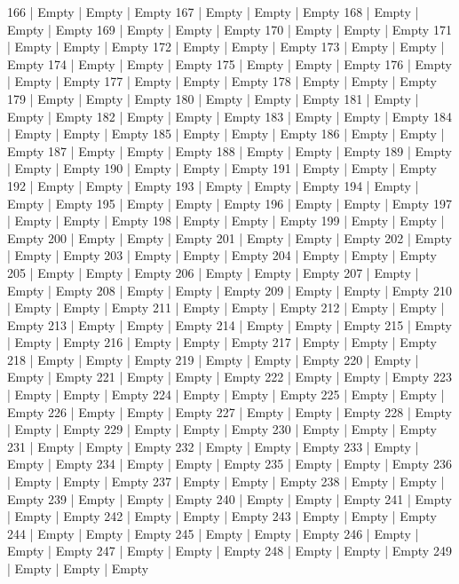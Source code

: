 166  | Empty  | Empty  | Empty
167  | Empty  | Empty  | Empty
168  | Empty  | Empty  | Empty
169  | Empty  | Empty  | Empty
170  | Empty  | Empty  | Empty
171  | Empty  | Empty  | Empty
172  | Empty  | Empty  | Empty
173  | Empty  | Empty  | Empty
174  | Empty  | Empty  | Empty
175  | Empty  | Empty  | Empty
176  | Empty  | Empty  | Empty
177  | Empty  | Empty  | Empty
178  | Empty  | Empty  | Empty
179  | Empty  | Empty  | Empty
180  | Empty  | Empty  | Empty
181  | Empty  | Empty  | Empty
182  | Empty  | Empty  | Empty
183  | Empty  | Empty  | Empty
184  | Empty  | Empty  | Empty
185  | Empty  | Empty  | Empty
186  | Empty  | Empty  | Empty
187  | Empty  | Empty  | Empty
188  | Empty  | Empty  | Empty
189  | Empty  | Empty  | Empty
190  | Empty  | Empty  | Empty
191  | Empty  | Empty  | Empty
192  | Empty  | Empty  | Empty
193  | Empty  | Empty  | Empty
194  | Empty  | Empty  | Empty
195  | Empty  | Empty  | Empty
196  | Empty  | Empty  | Empty
197  | Empty  | Empty  | Empty
198  | Empty  | Empty  | Empty
199  | Empty  | Empty  | Empty
200  | Empty  | Empty  | Empty
201  | Empty  | Empty  | Empty
202  | Empty  | Empty  | Empty
203  | Empty  | Empty  | Empty
204  | Empty  | Empty  | Empty
205  | Empty  | Empty  | Empty
206  | Empty  | Empty  | Empty
207  | Empty  | Empty  | Empty
208  | Empty  | Empty  | Empty
209  | Empty  | Empty  | Empty
210  | Empty  | Empty  | Empty
211  | Empty  | Empty  | Empty
212  | Empty  | Empty  | Empty
213  | Empty  | Empty  | Empty
214  | Empty  | Empty  | Empty
215  | Empty  | Empty  | Empty
216  | Empty  | Empty  | Empty
217  | Empty  | Empty  | Empty
218  | Empty  | Empty  | Empty
219  | Empty  | Empty  | Empty
220  | Empty  | Empty  | Empty
221  | Empty  | Empty  | Empty
222  | Empty  | Empty  | Empty
223  | Empty  | Empty  | Empty
224  | Empty  | Empty  | Empty
225  | Empty  | Empty  | Empty
226  | Empty  | Empty  | Empty
227  | Empty  | Empty  | Empty
228  | Empty  | Empty  | Empty
229  | Empty  | Empty  | Empty
230  | Empty  | Empty  | Empty
231  | Empty  | Empty  | Empty
232  | Empty  | Empty  | Empty
233  | Empty  | Empty  | Empty
234  | Empty  | Empty  | Empty
235  | Empty  | Empty  | Empty
236  | Empty  | Empty  | Empty
237  | Empty  | Empty  | Empty
238  | Empty  | Empty  | Empty
239  | Empty  | Empty  | Empty
240  | Empty  | Empty  | Empty
241  | Empty  | Empty  | Empty
242  | Empty  | Empty  | Empty
243  | Empty  | Empty  | Empty
244  | Empty  | Empty  | Empty
245  | Empty  | Empty  | Empty
246  | Empty  | Empty  | Empty
247  | Empty  | Empty  | Empty
248  | Empty  | Empty  | Empty
249  | Empty  | Empty  | Empty
